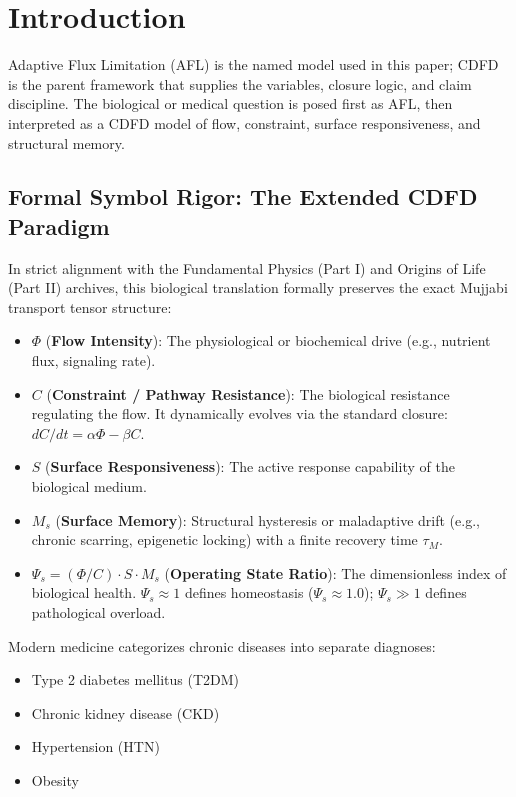 \documentclass[11pt]{article}
\begin{document}
\section{Introduction}

Adaptive Flux Limitation (AFL) is the named model used in this paper; CDFD is the parent framework that supplies the variables, closure logic, and claim discipline. The biological or medical question is posed first as AFL, then interpreted as a CDFD model of flow, constraint, surface responsiveness, and structural memory.

\subsection{Formal Symbol Rigor: The Extended CDFD Paradigm}
In strict alignment with the Fundamental Physics (Part I) and Origins of Life (Part II) archives, this biological translation formally preserves the exact Mujjabi transport tensor structure:
\begin{itemize}
    \item $\Phi$ (\textbf{Flow Intensity}): The physiological or biochemical drive (e.g., nutrient flux, signaling rate).
    \item $C$ (\textbf{Constraint / Pathway Resistance}): The biological resistance regulating the flow. It dynamically evolves via the standard closure: $dC/dt = \alpha \Phi - \beta C$.
    \item $S$ (\textbf{Surface Responsiveness}): The active response capability of the biological medium.
    \item $M_s$ (\textbf{Surface Memory}): Structural hysteresis or maladaptive drift (e.g., chronic scarring, epigenetic locking) with a finite recovery time $\tau_M$.
    \item $\Psi_s = (\Phi/C) \cdot S \cdot M_s$ (\textbf{Operating State Ratio}): The dimensionless index of biological health. $\Psi_s \approx 1$ defines homeostasis ($\Psi_s \approx 1.0$); $\Psi_s \gg 1$ defines pathological overload.
\end{itemize}


Modern medicine categorizes chronic diseases into separate diagnoses:

\begin{itemize}
    \item Type 2 diabetes mellitus (T2DM)
    \item Chronic kidney disease (CKD)
    \item Hypertension (HTN)
    \item Obesity
\end{itemize}
\end{document}
